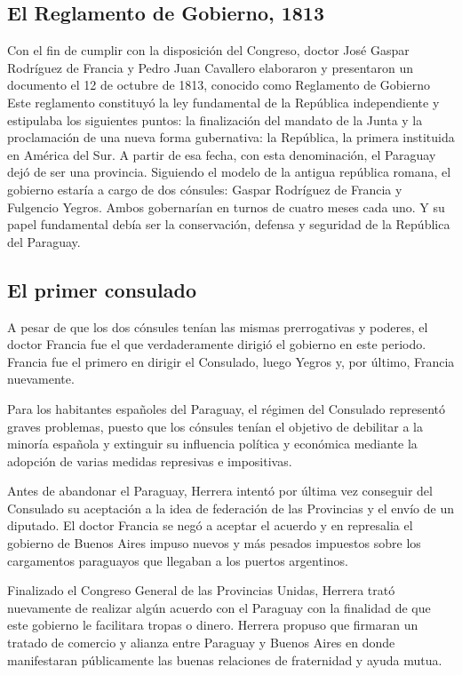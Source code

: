 \documentclass{article}
\begin{document}
  \subsection*{El Reglamento de Gobierno, 1813}
Con el fin de cumplir con la disposición del Congreso, doctor José Gaspar Rodríguez
de Francia y Pedro Juan Cavallero elaboraron y presentaron un documento el 12 de
octubre de 1813, conocido como Reglamento de Gobierno Este reglamento constituyó 
la ley fundamental de la República independiente y estipulaba los siguientes puntos:
la finalización del mandato de la Junta y la proclamación de una nueva forma
gubernativa: la República, la primera instituida en América del Sur. A partir
de esa fecha, con esta denominación, el Paraguay dejó de ser una provincia. Siguiendo
el modelo de la antigua república romana, el gobierno estaría a cargo de dos 
cónsules: Gaspar Rodríguez de Francia y Fulgencio Yegros. Ambos gobernarían en turnos
de cuatro meses cada uno. Y su papel fundamental debía ser la conservación, defensa
y seguridad de la República del Paraguay.

  \subsection*{El primer consulado}

A pesar de que los dos cónsules tenían las mismas prerrogativas y poderes, el doctor 
Francia fue el que verdaderamente dirigió el gobierno en este periodo. Francia
fue el primero en dirigir el Consulado, luego Yegros y, por último, Francia nuevamente.

Para los habitantes españoles del Paraguay, el régimen del Consulado representó graves
problemas, puesto que los cónsules tenían el objetivo de debilitar a la minoría española
y extinguir su influencia política y económica mediante la adopción de varias medidas
represivas e impositivas.

Antes de abandonar el Paraguay, Herrera intentó por última vez conseguir del Consulado su
aceptación  a la idea de federación de las Provincias y el envío de un diputado. El doctor
Francia se negó a aceptar el acuerdo y en represalia el gobierno de Buenos Aires impuso 
nuevos y más pesados impuestos sobre los cargamentos paraguayos que llegaban a los puertos argentinos.

Finalizado el Congreso General de las Provincias Unidas, Herrera trató nuevamente de
realizar algún acuerdo con el Paraguay con la finalidad de que este gobierno le facilitara
tropas o dinero. Herrera propuso que firmaran un tratado de comercio y alianza entre 
Paraguay y Buenos Aires en donde manifestaran públicamente las buenas relaciones de
fraternidad y ayuda mutua.
\end{document}
